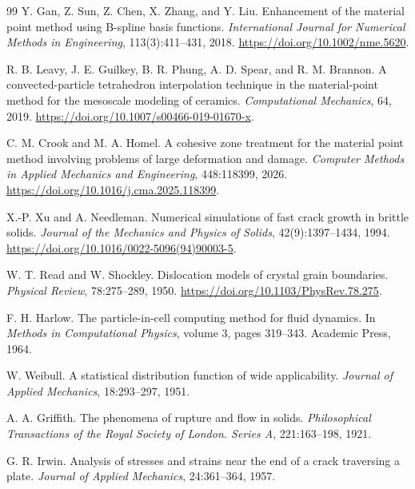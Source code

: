 \begin{thebibliography}{99}
Y. Gan, Z. Sun, Z. Chen, X. Zhang, and Y. Liu.
\newblock Enhancement of the material point method using B-spline basis functions.
\newblock \emph{International Journal for Numerical Methods in Engineering}, 113(3):411--431, 2018.
\newblock \url{https://doi.org/10.1002/nme.5620}.

R. B. Leavy, J. E. Guilkey, B. R. Phung, A. D. Spear, and R. M. Brannon.
\newblock A convected-particle tetrahedron interpolation technique in the material-point method for the mesoscale modeling of ceramics.
\newblock \emph{Computational Mechanics}, 64, 2019.
\newblock \url{https://doi.org/10.1007/s00466-019-01670-x}.


C. M. Crook and M. A. Homel.
\newblock A cohesive zone treatment for the material point method involving problems of large deformation and damage.
\newblock \emph{Computer Methods in Applied Mechanics and Engineering}, 448:118399, 2026.
\newblock \url{https://doi.org/10.1016/j.cma.2025.118399}.


X.-P. Xu and A. Needleman.
\newblock Numerical simulations of fast crack growth in brittle solids.
\newblock \emph{Journal of the Mechanics and Physics of Solids}, 42(9):1397--1434, 1994.
\newblock \url{https://doi.org/10.1016/0022-5096(94)90003-5}.


W. T. Read and W. Shockley.
\newblock Dislocation models of crystal grain boundaries.
\newblock \emph{Physical Review}, 78:275--289, 1950.
\newblock \url{https://doi.org/10.1103/PhysRev.78.275}.



F. H. Harlow.
\newblock The particle-in-cell computing method for fluid dynamics.
\newblock In \emph{Methods in Computational Physics}, volume 3, pages 319--343. Academic Press, 1964.


W. Weibull.
\newblock A statistical distribution function of wide applicability.
\newblock \emph{Journal of Applied Mechanics}, 18:293--297, 1951.

A. A. Griffith.
\newblock The phenomena of rupture and flow in solids.
\newblock \emph{Philosophical Transactions of the Royal Society of London. Series A}, 221:163--198, 1921.

G. R. Irwin.
\newblock Analysis of stresses and strains near the end of a crack traversing a plate.
\newblock \emph{Journal of Applied Mechanics}, 24:361--364, 1957.


\end{thebibliography}
